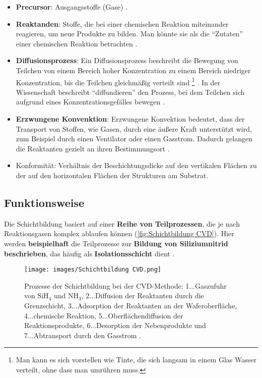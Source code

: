 \documentclass{article} %
\begin{document}
\begin{itemize}
    \item \textbf{Precursor}: Ausgangsstoffe (Gase) \cite{keplinger2024CVD}. 
    \item \textbf{Reaktanden}: Stoffe, die bei einer chemischen Reaktion miteinander reagieren, um neue Produkte zu bilden. Man könnte sie als die ``Zutaten'' 
    einer chemischen Reaktion betrachten \cite{petrucci_general_chemistry, chang_chemistry}.
    \item \textbf{Diffusionsprozess}: Ein Diffusionsprozess beschreibt die Bewegung von Teilchen von einem Bereich hoher Konzentration zu einem Bereich niedriger 
    Konzentration, bis die Teilchen gleichmäßig verteilt sind \footnote{Man kann es sich vorstellen wie Tinte, die sich langsam in einem Glas Wasser verteilt, ohne 
    dass man umrühren muss.} \cite{bergman2011, incropera2007}. In der Wissenschaft beschreibt ``diffundieren'' den Prozess, bei dem Teilchen sich aufgrund eines 
    Konzentrationsgefälles bewegen \cite{crank1975}.
    \item \textbf{Erzwungene Konvenktion}: Erzwungene Konvektion bedeutet, dass der Transport von Stoffen, wie Gasen, durch eine äußere Kraft unterstützt wird, 
    zum Beispiel durch einen Ventilator oder einen Gasstrom. Dadurch gelangen die Reaktanten gezielt an ihren Bestimmungsort \cite{incropera2007, bergman2011, 
    kays2005, bejan2013}.
    \item{Konformität}: Verhältnis der Beschichtungsdicke auf den vertikalen Flächen zu der auf den horizontalen Flächen der Strukturen am Substrat.
\end{itemize}

\vspace{1em}
\subsection{Funktionsweise} %
Die Schichtbildung basiert auf einer \textbf{Reihe von Teilprozessen}, die je nach Reaktionsgasen komplex ablaufen können (\autoref{fig:Schichtbildung CVD}). 
Hier werden \textbf{beispielhaft} die Teilprozesse zur \textbf{Bildung von Siliziumnitrid beschrieben}, das häufig als \textbf{Isolationsschicht} dient 
\cite{keplinger2024CVD}.

\begin{figure}[htb!]
    \centering
    \texttt{[image: images/Schichtbildung CVD.png]} %
    \captionsetup{labelfont=bf} %
    \caption{Prozesse der Schichtbildung bei der CVD-Methode: 1...Gaszufuhr von SiH$_4$ und NH$_3$, 2...Diffusion der Reaktanten durch die Grenzschicht, 
    3...Adsorption der Reaktanten an der Waferoberfläche, 4...chemische Reaktion, 5...Oberflächendiffusion der Reaktionsprodukte, 6...Desorption der Nebenprodukte 
    und 7...Abtransport durch den Gasstrom \cite{keplinger2024CVD}.}
    \label{fig:Schichtbildung CVD}
\end{figure}
\end{document}
